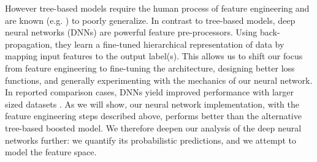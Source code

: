 However tree-based models require the human process of feature engineering and are known (e.g. \cite{bengio2010decision}) to poorly generalize.
In contrast to tree-based models, deep neural networks (DNNs) are powerful feature pre-processors. Using back-propagation, they learn a fine-tuned hierarchical representation of data by mapping input features to the output label(s). This allows us to shift our focus from feature engineering to fine-tuning the architecture, designing better loss functions, and generally experimenting with the mechanics of our neural network. In reported comparison cases, DNNs yield improved performance with larger sized datasets \citep{airbnb}. As we will show, our neural network implementation, with the feature engineering steps described above, performs better than the alternative tree-based boosted model. We therefore deepen our analysis of the deep neural networks further: we quantify its probabilistic predictions, and we attempt to model the feature space.




\iffalse

\begin{figure*}
\begin{subfigure}{0.49\textwidth}
    \centering
    \texttt{[image: cfht\_mdn.PNG]}
    \caption{Finding lower and upper learning rates.}
    \label{fig:mdn}
\end{subfigure}
\begin{subfigure}{0.49\textwidth}
    \centering
    \texttt{[image: cfht\_rvae.PNG]}
    \caption{Calibration Curve}
    \label{fig:vae}
\end{subfigure}
\end{figure*}
\fi

%
%









